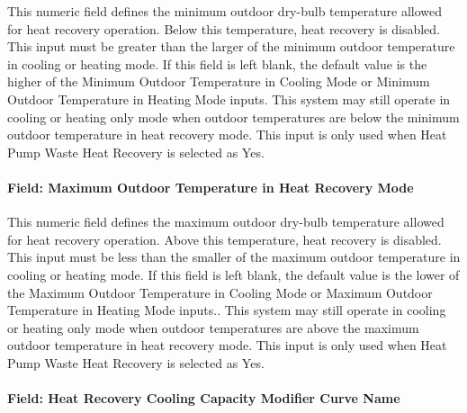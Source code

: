 This numeric field defines the minimum outdoor dry-bulb temperature allowed for heat recovery operation. Below this temperature, heat recovery is disabled. This input must be greater than the larger of the minimum outdoor temperature in cooling or heating mode. If this field is left blank, the default value is the higher of the Minimum Outdoor Temperature in Cooling Mode or Minimum Outdoor Temperature in Heating Mode inputs. This system may still operate in cooling or heating only mode when outdoor temperatures are below the minimum outdoor temperature in heat recovery mode. This input is only used when Heat Pump Waste Heat Recovery is selected as Yes.

\paragraph{Field: Maximum Outdoor Temperature in Heat Recovery Mode}\label{field-maximum-outdoor-temperature-in-heat-recovery-mode-000}

This numeric field defines the maximum outdoor dry-bulb temperature allowed for heat recovery operation. Above this temperature, heat recovery is disabled. This input must be less than the smaller of the maximum outdoor temperature in cooling or heating mode. If this field is left blank, the default value is the lower of the Maximum Outdoor Temperature in Cooling Mode or Maximum Outdoor Temperature in Heating Mode inputs.. This system may still operate in cooling or heating only mode when outdoor temperatures are above the maximum outdoor temperature in heat recovery mode. This input is only used when Heat Pump Waste Heat Recovery is selected as Yes.

\paragraph{Field: Heat Recovery Cooling Capacity Modifier Curve Name}\label{field-heat-recovery-cooling-capacity-modifier-curve-name}

